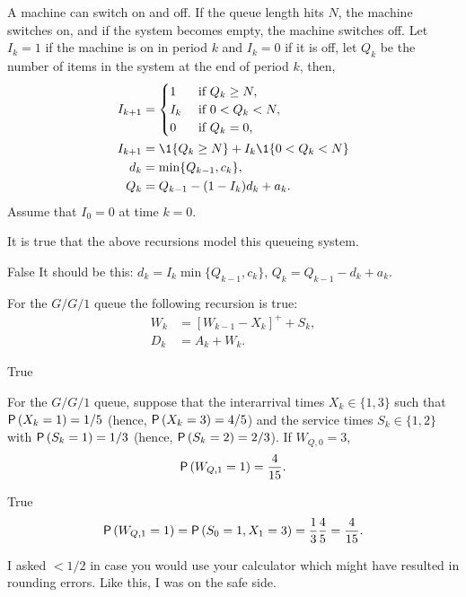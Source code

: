 \begin{exercise}[201703] A machine can switch on and off. If the queue length
  hits $N$, the machine switches on, and if the system becomes empty,
  the machine switches off.  Let $I_k=1$ if the machine is on in
  period $k$ and $I_k=0$ if it is off, let $Q_k$ be the number of
  items in the system at the end of period $k$, then, 
    \begin{align*}
      I_{k+1} &=
      \begin{cases}
        1 & \text{ if } Q_{k} \geq N,\\
        I_k & \text{ if } 0< Q_{k} <N,\\
        0 & \text{ if }  Q_{k} =0,\\
      \end{cases}\\
  I_{k+1} &= \1{Q_k\geq N} + I_k \1{0<Q_k<N} \\
d_k &=\min\{Q_{k-1}, c_k\}, \\
Q_k &= Q_{k-1} - (1-I_k) d_k + a_k.
    \end{align*}
    Assume that $I_0 =0$ at time $k=0$. 

It is true that the above
    recursions model this queueing system.

  \begin{solution}
    False
It should be this: $d_k =I_k \min\{Q_{k-1}, c_k\}$,  $Q_k = Q_{k-1} - d_k + a_k$.

  \end{solution}
\end{exercise}


\begin{exercise}[201703]
For the $G/G/1$ queue the following recursion is true: 
\begin{align*}
  W_{k} &= [W_{k-1} - X_k]^+ + S_k,\\
  D_k &= A_k + W_k.
\end{align*}

  \begin{solution}
    True
  \end{solution}
\end{exercise}

\begin{exercise}[201703]
  For the $G/G/1$ queue, suppose that the interarrival times
  $X_k\in\{1,3\}$ such that $\P{X_k=1}=1/5$ (hence, $\P{X_k=3}=4/5$)
  and the service times $S_k\in\{1,2\}$ with $\P{S_k=1}=1/3$ (hence,
  $\P{S_k=2}=2/3$). If $W_{Q,0}=3$,
  \begin{equation*}
    \P{W_{Q,1} = 1} =\frac4{15}.
  \end{equation*}

  \begin{solution}
    True
  \begin{equation*}
    \P{W_{Q,1} = 1} = \P{S_0=1, X_1=3}=\frac13\frac 45 = \frac4{15}.
  \end{equation*}

  I asked $<1/2$ in case you would use your calculator which might
  have resulted in rounding errors. Like this, I was on the safe side.
  \end{solution}
\end{exercise}

